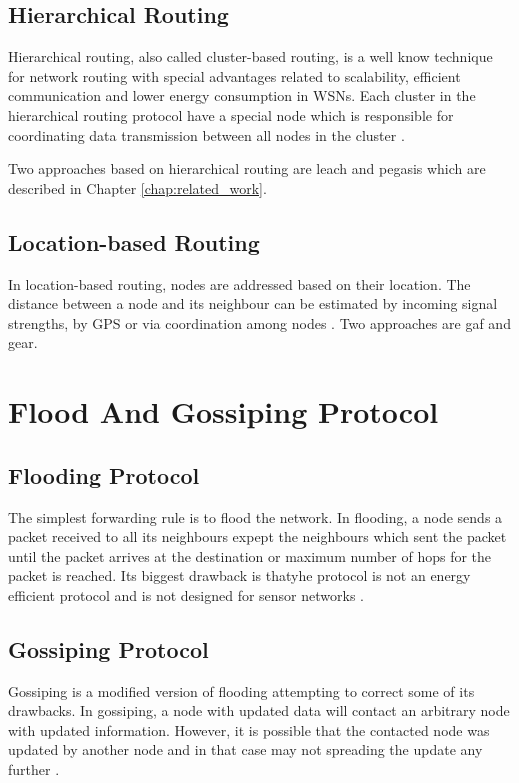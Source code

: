 \documentclass[USenglish]{uit-thesis}
\begin{document}
\subsection{Hierarchical Routing}
Hierarchical routing, also called cluster-based routing, is a well know technique for network routing with special advantages related to scalability, efficient communication and lower energy consumption in WSNs. Each cluster in the hierarchical routing protocol have a special node which is responsible for coordinating data transmission between all nodes in the cluster \cite{leach, leach_perf, routing_survey}.


Two approaches based on hierarchical routing are \gls{leach}\cite{leach} and \gls{pegasis}\cite{pegasis} which are described in Chapter \ref{chap:related_work}.


\subsection{Location-based Routing}
In location-based routing, nodes are addressed based on their location. The distance between a node and its neighbour can be estimated by incoming signal strengths, by GPS or via coordination among nodes \cite{routing_survey}. Two approaches are \gls{gaf}\cite{gaf} and \gls{gear}\cite{gear}.


\section{Flood And Gossiping Protocol}
\subsection{Flooding Protocol}
The simplest forwarding rule is to flood the network. In flooding, a node sends a packet received to all its neighbours expept the neighbours which sent the packet until the packet arrives at the destination or maximum number of hops for the packet is reached. Its biggest drawback is thatyhe protocol is not an energy efficient protocol and is not designed for sensor networks \cite{wsnbook}.

\subsection{Gossiping Protocol}
Gossiping is a modified version of flooding attempting to correct some of its drawbacks. In gossiping, a node with updated data will contact an arbitrary node with updated information. However, it is possible that the contacted node was updated by another node and in that case may not spreading the update any further \cite{dsbook}.
\end{document}
